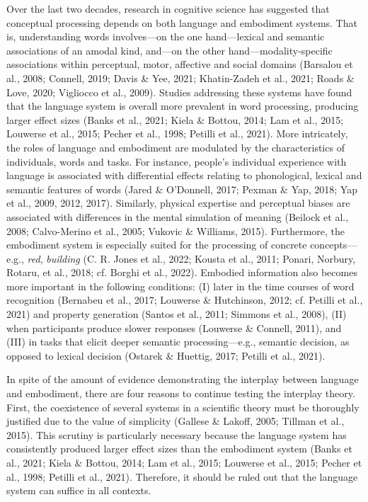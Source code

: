 \documentclass[
  12pt,
  man,floatsintext]{apa7}
\begin{document}
Over the last two decades, research in cognitive science has suggested that conceptual processing depends on both language and embodiment systems. That is, understanding words involves---on the one hand---lexical and semantic associations of an amodal kind, and---on the other hand---modality-specific associations within perceptual, motor, affective and social domains (Barsalou et al., 2008; Connell, 2019; Davis \& Yee, 2021; Khatin-Zadeh et al., 2021; Roads \& Love, 2020; Vigliocco et al., 2009). Studies addressing these systems have found that the language system is overall more prevalent in word processing, producing larger effect sizes (Banks et al., 2021; Kiela \& Bottou, 2014; Lam et al., 2015; Louwerse et al., 2015; Pecher et al., 1998; Petilli et al., 2021). More intricately, the roles of language and embodiment are modulated by the characteristics of individuals, words and tasks. For instance, people's individual experience with language is associated with differential effects relating to phonological, lexical and semantic features of words (Jared \& O'Donnell, 2017; Pexman \& Yap, 2018; Yap et al., 2009, 2012, 2017). Similarly, physical expertise and perceptual biases are associated with differences in the mental simulation of meaning (Beilock et al., 2008; Calvo-Merino et al., 2005; Vukovic \& Williams, 2015). Furthermore, the embodiment system is especially suited for the processing of concrete concepts---e.g., \emph{red}, \emph{building} (C. R. Jones et al., 2022; Kousta et al., 2011; Ponari, Norbury, Rotaru, et al., 2018; cf. Borghi et al., 2022). Embodied information also becomes more important in the following conditions: (I) later in the time courses of word recognition (Bernabeu et al., 2017; Louwerse \& Hutchinson, 2012; cf. Petilli et al., 2021) and property generation (Santos et al., 2011; Simmons et al., 2008), (II) when participants produce slower responses (Louwerse \& Connell, 2011), and (III) in tasks that elicit deeper semantic processing---e.g., semantic decision, as opposed to lexical decision (Ostarek \& Huettig, 2017; Petilli et al., 2021).

In spite of the amount of evidence demonstrating the interplay between language and embodiment, there are four reasons to continue testing the interplay theory. First, the coexistence of several systems in a scientific theory must be thoroughly justified due to the value of simplicity (Gallese \& Lakoff, 2005; Tillman et al., 2015). This scrutiny is particularly necessary because the language system has consistently produced larger effect sizes than the embodiment system (Banks et al., 2021; Kiela \& Bottou, 2014; Lam et al., 2015; Louwerse et al., 2015; Pecher et al., 1998; Petilli et al., 2021). Therefore, it should be ruled out that the language system can suffice in all contexts.
\end{document}
